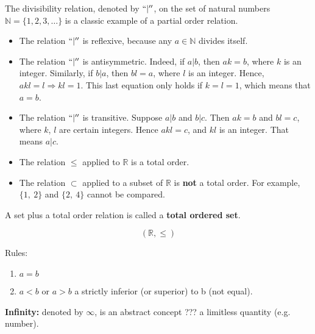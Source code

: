 \documentclass[12pt, a4paper]{book}
\begin{document}
\begin{exmp}
  The divisibility relation, denoted by $``|''$, on the set of natural numbers $\mathbb{N} = \{1,2,3,\ldots\}$ is a classic example of a partial order relation.
  \begin{itemize}
    \item The relation $``|''$ is reflexive, because any $a\in\mathbb{N}$ divides itself.
    \item The relation $``|''$ is antisymmetric. Indeed, if $a|b$, then $ak=b$, where $k$ is an integer. Similarly, if $b|a$, then $bl=a$, where $l$ is an integer. Hence, $akl=l\Rightarrow kl=1$. This last equation only holds if $k=l=1$, which means that $a=b$.
    \item The relation $``|''$ is transitive. Suppose $a|b$ and $b|c$. Then $ak=b$ and $bl=c$, where $k$, $l$ are certain integers. Hence $akl=c$, and $kl$ is an integer. That means $a|c$.
  \end{itemize}
\end{exmp}

\begin{exmp}
  \begin{itemize}
    \item The relation $\leq$ applied to $\mathbb{R}$ is a total order.
    \item The relation $\subset$ applied to a subset of $\mathbb{R}$ is \textbf{not} a total order. For example, $\{1, \ 2\}$ and $\{2, \ 4\}$ cannot be compared.  
  \end{itemize}
\end{exmp}

\begin{defn}
  A set plus a total order relation is called a \textbf{total ordered set}.
\end{defn}

\begin{exmp}
  \[
    (\mathbb{R}, \leq)
  \]

  Rules:
  \begin{enumerate}
    \item $a=b$
    \item $a<b$ or $a>b$ a strictly inferior (or superior) to b (not equal).
  \end{enumerate}
\end{exmp}

\begin{defn}
  \textbf{Infinity:} denoted by $\infty$, is an abstract concept ??? a limitless quantity (e.g. number).
\end{defn}
\end{document}
